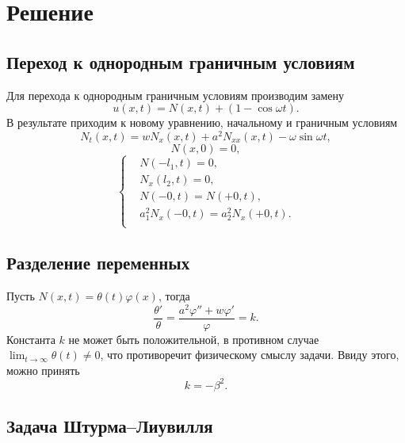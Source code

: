 \documentclass[12pt, a4paper]{article}
\begin{document}
\section{Решение}
\subsection{Переход к однородным граничным условиям}
Для перехода к однородным граничным условиям производим замену
\begin{equation}
  u(x,t) = N(x,t) + (1 - \cos \omega t).
\end{equation}
В результате приходим к новому уравнению, начальному и граничным условиям
\begin{equation}
  N_t(x,t) = w N_x(x,t) + a^2 N_{xx}(x,t) - \omega\sin\omega t,
  \label{eq:14}
\end{equation}
\begin{equation}
  N(x,0) = 0,
\end{equation}
\begin{equation}
  \left\{
  \begin{aligned}
    & N(-l_1,t) = 0, \\
    & N_x(l_2,t) = 0, \\
    & N(-0, t) = N(+0, t), \\
    & a_1^2 N_{x}(-0, t) = a_2^2 N_{x}(+0, t). \\
  \end{aligned}
  \right.
  \label{eq:15}
\end{equation}
\subsection{Разделение переменных}
Пусть $ N(x,t)=\theta(t)\varphi(x) $, тогда
\begin{equation}
  \frac{\theta'}{\theta}=\frac{a^2\varphi''+w\varphi'}{\varphi}=k.
  \label{eq:1}
\end{equation}
Константа $ k $ не может быть положительной, в противном случае $\lim_{t \rightarrow \infty}\theta(t) \ne 0$, что противоречит физическому смыслу задачи. Ввиду этого, можно принять
\begin{equation}
  k=-\beta^2.
  \label{eq:2}
\end{equation}
\subsection{Задача Штурма--Лиувилля}
\end{document}
